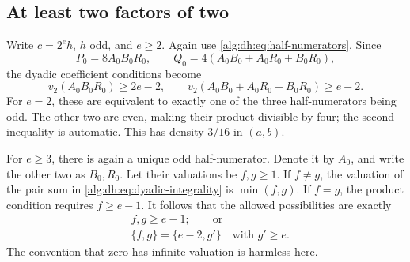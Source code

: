 \documentclass[11pt]{article}
\numberwithin{equation}{section}
\theoremstyle{plain}
\theoremstyle{plain}
\theoremstyle{plain}
\theoremstyle{definition}
\theoremstyle{definition}
\theoremstyle{definition}
\theoremstyle{remark}
\begin{document}
\subsection{At least two factors of two}
Write $c=2^e h$, $h$ odd, and $e\ge2$. Again use
\eqref{alg:dh:eq:half-numerators}. Since
\[
 P_0=8A_0B_0R_0,\qquad
 Q_0=4(A_0B_0+A_0R_0+B_0R_0),
\]
the dyadic coefficient conditions become
\begin{equation}\label{alg:dh:eq:dyadic-integrality}
 v_2(A_0B_0R_0)\ge2e-2,\qquad
 v_2(A_0B_0+A_0R_0+B_0R_0)\ge e-2.
\end{equation}
For $e=2$, these are equivalent to exactly one of the three half-numerators
being odd. The other two are even, making their product divisible by
four; the second inequality is automatic. This has density $3/16$ in
$(a,b)$.

For $e\ge3$, there is again a unique odd half-numerator. Denote it by
$A_0$, and write the other two as $B_0,R_0$. Let their valuations be
$f,g\ge1$. If $f\ne g$, the valuation of the pair sum in
\eqref{alg:dh:eq:dyadic-integrality} is $\min(f,g)$. If $f=g$, the product
condition requires $f\ge e-1$. It follows that the allowed possibilities
are exactly
\begin{equation}\label{alg:dh:eq:dyadic-pattern}
\begin{split}
 &f,g\ge e-1;\qquad\text{or}\\
 &\{f,g\}=\{e-2,g'\}\quad\text{with }g'\ge e.
\end{split}
\end{equation}
The convention that zero has infinite valuation is harmless here.
\end{document}
